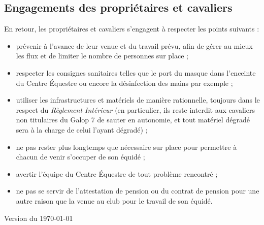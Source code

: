 \documentclass[11pt,a4paper]{article}
\begin{document}
	\subsection*{Engagements des propriétaires et cavaliers}
		En retour, les propriétaires et cavaliers s'engagent à respecter les points suivants :
		\begin{itemize}
			\item prévenir à l'avance de leur venue et du travail prévu, afin de gérer au mieux les flux et de limiter le nombre de personnes sur place ;
			\item respecter les consignes sanitaires telles que le port du masque dans l'enceinte du Centre Équestre ou encore la désinfection des mains par exemple ;
			\item utiliser les infrastructures et matériels de manière rationnelle, toujours dans le respect du \textit{Règlement Intérieur} (en particulier, ils reste interdit aux cavaliers non titulaires du Galop 7 de sauter en autonomie, et tout matériel dégradé sera à la charge de celui l'ayant dégradé) ;
			\item ne pas rester plus longtemps que nécessaire sur place pour permettre à chacun de venir s'occuper de son équidé ;
			\item avertir l'équipe du Centre Équestre de tout problème rencontré ;
			\item ne pas se servir de l'attestation de pension ou du contrat de pension pour une autre raison que la venue au club pour le travail de son équidé.
		\end{itemize}


\vfill
\begin{flushright}
	Version du \today
\end{flushright}
\end{document}

